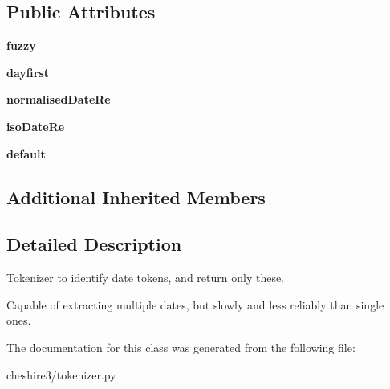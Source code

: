 \subsection*{Public Attributes}
\begin{DoxyCompactItemize}
\item 
\hypertarget{classcheshire3_1_1tokenizer_1_1_date_tokenizer_ab07f0bf0891daeec154d9b58ebbe7915}{{\bfseries fuzzy}}\label{classcheshire3_1_1tokenizer_1_1_date_tokenizer_ab07f0bf0891daeec154d9b58ebbe7915}

\item 
\hypertarget{classcheshire3_1_1tokenizer_1_1_date_tokenizer_a3c81c1372b792bb549f9d032215495f3}{{\bfseries dayfirst}}\label{classcheshire3_1_1tokenizer_1_1_date_tokenizer_a3c81c1372b792bb549f9d032215495f3}

\item 
\hypertarget{classcheshire3_1_1tokenizer_1_1_date_tokenizer_ac950a3cf0d221538151e645b8a7886f2}{{\bfseries normalised\-Date\-Re}}\label{classcheshire3_1_1tokenizer_1_1_date_tokenizer_ac950a3cf0d221538151e645b8a7886f2}

\item 
\hypertarget{classcheshire3_1_1tokenizer_1_1_date_tokenizer_a09da223de6003de54c05bed6751127e0}{{\bfseries iso\-Date\-Re}}\label{classcheshire3_1_1tokenizer_1_1_date_tokenizer_a09da223de6003de54c05bed6751127e0}

\item 
\hypertarget{classcheshire3_1_1tokenizer_1_1_date_tokenizer_a3e47c2a367f1908fffd6e093fb592ff2}{{\bfseries default}}\label{classcheshire3_1_1tokenizer_1_1_date_tokenizer_a3e47c2a367f1908fffd6e093fb592ff2}

\end{DoxyCompactItemize}
\subsection*{Additional Inherited Members}


\subsection{Detailed Description}
\begin{DoxyVerb}Tokenizer to identify date tokens, and return only these.

Capable of extracting multiple dates, but slowly and less reliably than
single ones.
\end{DoxyVerb}
 

The documentation for this class was generated from the following file\-:\begin{DoxyCompactItemize}
\item 
cheshire3/tokenizer.\-py\end{DoxyCompactItemize}
